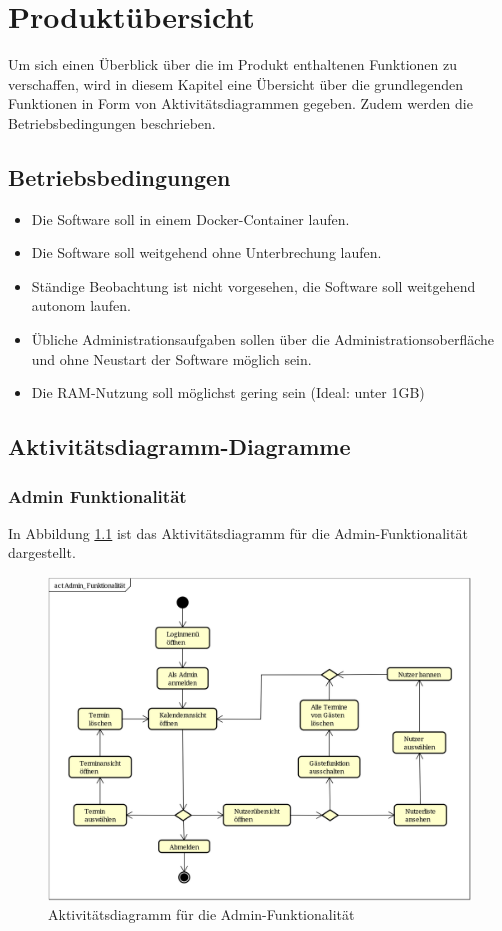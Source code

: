
\chapter{Produktübersicht}
\label{chap:product_overview}
Um sich einen Überblick über die im Produkt enthaltenen Funktionen zu verschaffen, wird in diesem Kapitel eine Übersicht über die grundlegenden Funktionen in Form von Aktivitätsdiagrammen gegeben.
Zudem werden die Betriebsbedingungen beschrieben.
\section{Betriebsbedingungen}
\begin{itemize}
    \item Die Software soll in einem \gls{Docker}-\gls{Container} laufen.
    \item Die Software soll weitgehend ohne Unterbrechung laufen.
    \item Ständige Beobachtung ist nicht vorgesehen, die Software soll weitgehend autonom laufen.
    \item Übliche Administrationsaufgaben sollen über die Administrationsoberfläche und ohne Neustart der Software möglich sein.
    \item Die \gls{RAM}-Nutzung soll möglichst gering sein (Ideal: unter 1GB)
\end{itemize}

\newpage
\section{Aktivitätsdiagramm-Diagramme}

\subsection{Admin Funktionalität}
In Abbildung \ref{fig:activity_diagram_admin} ist das Aktivitätsdiagramm für die Admin-Funktionalität dargestellt.
\begin{figure}[ht]
    \centering
    \includegraphics[scale=0.15]{figures/activitydiagrams/adminfunk}
    \caption{Aktivitätsdiagramm für die Admin-Funktionalität}
    \label{fig:activity_diagram_admin}
\end{figure}
\clearpage
